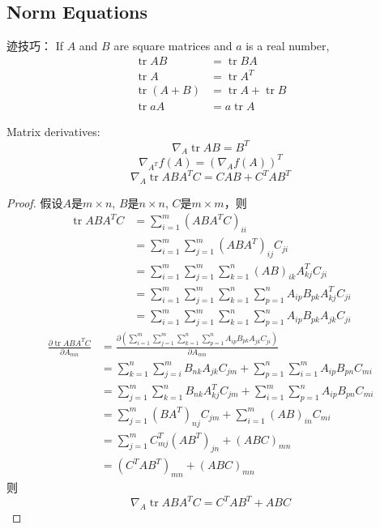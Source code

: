 \documentclass[UTF8]{ctexart}
\DeclareMathOperator{\tr}{tr}
\newtheorem{proof}{证明}[section]
\begin{document}
	\subsection{Norm Equations}
	迹技巧：
	If $A$ and $B$ are square matrices and $a$ is a real number,
	\begin{equation*}
	\begin{aligned}
	\tr AB&=\tr BA \\
	\tr A&=\tr A^T \\
	\tr (A+B)&=\tr A + \tr B \\
	\tr aA &= a\tr A 
	\end{aligned}	
	\end{equation*}
	
	Matrix derivatives:
	\begin{equation*}
		\nabla_A\tr AB =B^T
	\end{equation*}	
	\begin{equation*}
		\nabla_{A^T}f(A) =(\nabla_Af(A))^T
	\end{equation*}
	\begin{equation*}
		\nabla_A\tr ABA^TC =CAB+C^TAB^T
	\end{equation*}
	\begin{proof}
		假设$A$是$m\times n$, $B$是$n\times n$, $C$是$m\times m$，则
		\begin{equation*}
		\begin{aligned}
			\tr ABA^TC & = \sum_{i=1}^{m}(ABA^TC)_{ii} \\
			& = \sum_{i=1}^{m}\sum_{j=1}^{m}(ABA^T)_{ij}C_{ji} \\
			& = \sum_{i=1}^{m}\sum_{j=1}^{m}\sum_{k=1}^{n}(AB)_{ik}A^T_{kj}C_{ji} \\
			& = \sum_{i=1}^{m}\sum_{j=1}^{m}\sum_{k=1}^{n}\sum_{p=1}^{n}A_{ip}B_{pk}A^T_{kj}C_{ji} \\
			& = \sum_{i=1}^{m}\sum_{j=1}^{m}\sum_{k=1}^{n}\sum_{p=1}^{n}A_{ip}B_{pk}A_{jk}C_{ji}
		\end{aligned}
		\end{equation*}
		\begin{equation*}
		\begin{aligned}
			\frac{\partial\tr ABA^TC}{\partial A_{mn}} & = \frac{\partial(\sum\limits_{i=1}^{m}\sum\limits_{j=1}^{m}\sum\limits_{k=1}^{n}\sum\limits_{p=1}^{n}A_{ip}B_{pk}A_{jk}C_{ji})}{\partial A_{mn}} \\
			& = \sum\limits_{k=1}^{n}\sum\limits_{j=i}^{m}B_{nk}A_{jk}C_{jm}+\sum\limits_{p=1}^{n}\sum\limits_{i=1}^{m}A_{ip}B_{pn}C_{mi} \\
			& = \sum\limits_{j=1}^{m}\sum\limits_{k=1}^{n}B_{nk}A^T_{kj}C_{jm}+\sum\limits_{i=1}^{m}\sum\limits_{p=1}^{n}A_{ip}B_{pn}C_{mi} \\
			& = \sum\limits_{j=1}^{m}(BA^T)_{nj}C_{jm}+\sum\limits_{i=1}^{m}(AB)_{in}C_{mi} \\
			& = \sum\limits_{j=1}^{m}C^T_{mj}(AB^T)_{jn}+(ABC)_{mn} \\
			& = (C^TAB^T)_{mn} + (ABC)_{mn}
		\end{aligned}
		\end{equation*}
		则
		\begin{equation*}
			\nabla_A\tr ABA^TC = C^TAB^T + ABC
		\end{equation*}
	\end{proof}
\end{document}
